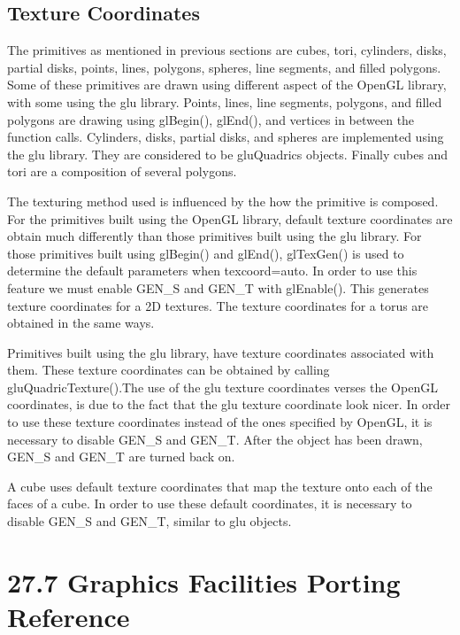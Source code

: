 \subsection{Texture Coordinates}

The primitives as mentioned in previous sections are cubes, tori,
cylinders, disks, partial disks, points, lines, polygons, spheres,
line segments, and filled polygons. Some of these primitives are drawn
using different aspect of the OpenGL library, with some using the glu
library. Points, lines, line segments, polygons, and filled polygons
are drawing using \textsf{glBegin()}, \textsf{glEnd()}, and vertices
in between the function calls. Cylinders, disks, partial disks, and
spheres are implemented using the glu library. They are considered to
be\textsf{ gluQuadrics} objects. Finally cubes and tori are a
composition of several polygons.

The texturing method used is influenced by the how the primitive is
composed. For the primitives built using the OpenGL library, default
texture coordinates are obtain much differently than those primitives
built using the glu library. For those primitives built using
\textsf{glBegin()} and \textsf{glEnd()}, \textsf{glTexGen()} is used
to determine the default parameters when
\textsf{{\textquotedbl}texcoord=auto{\textquotedbl}}. In order to use
this feature we must enable \textsf{GEN\_S} and \textsf{GEN\_T} with
\textsf{glEnable().} This generates texture coordinates for a 2D
textures. The texture coordinates for a torus are obtained in the same
ways.

Primitives built using the glu library, have texture coordinates
associated with them. These texture coordinates can be obtained by
calling \textsf{gluQuadricTexture()}.The use of the glu texture
coordinates verses the OpenGL coordinates, is due to the fact that the
glu texture coordinate look nicer. In order to use these texture
coordinates instead of the ones specified by OpenGL, it is necessary
to disable \textsf{GEN\_S} and \textsf{GEN\_T}. After the object has
been drawn, \textsf{GEN\_S} and \textsf{GEN\_T} are turned back on.

A cube uses default texture coordinates that map the texture onto each
of the faces of a cube. In order to use these default coordinates, it
is necessary to disable \textsf{GEN\_S} and \textsf{GEN\_T}, similar
to glu objects.

\section[27.7 Graphics Facilities Porting Reference]{27.7 Graphics Facilities Porting Reference}

